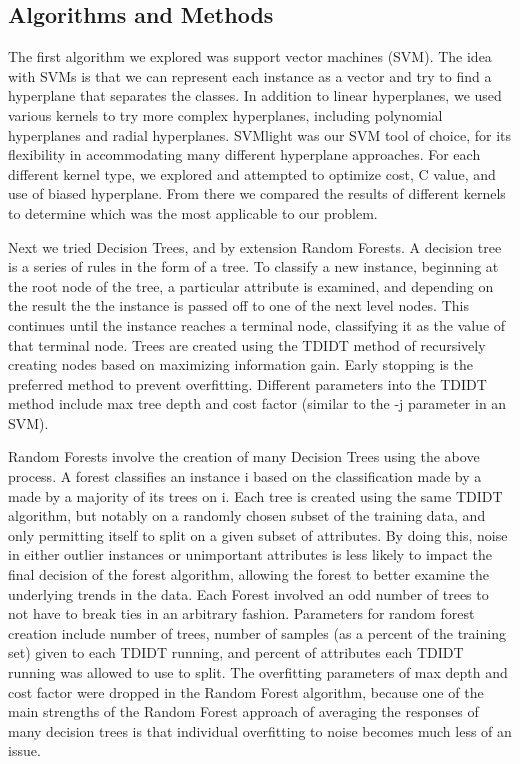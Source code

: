 \documentclass{article}
\begin{document}
\subsection{Algorithms and Methods}
The first algorithm we explored was support vector machines (SVM). The idea with SVMs is that we can represent each instance as a vector and try to find a hyperplane that separates the classes. In addition to linear hyperplanes, we used various kernels to try more complex hyperplanes, including polynomial hyperplanes and radial hyperplanes. SVMlight was our SVM tool of choice, for its flexibility in accommodating many different hyperplane approaches.  
For each different kernel type, we explored and attempted to optimize cost, C value, and use of biased hyperplane. From there we compared the results of different kernels to determine which was the most applicable to our problem.

Next we tried Decision Trees, and by extension Random Forests. A decision tree is a series of rules in the form of a tree. To classify a new instance, beginning at the root node of the tree, a particular attribute is examined, and depending on the result the the instance is passed off to one of the next level nodes. This continues until the instance reaches a terminal node, classifying it as the value of that terminal node. Trees are created using the TDIDT method of recursively creating nodes based on maximizing information gain. Early stopping is the preferred method to prevent overfitting. Different parameters into the TDIDT method include max tree depth and cost factor (similar to the -j parameter in an SVM). 

Random Forests involve the creation of many Decision Trees using the above process. A forest classifies an instance i based on the classification made by a made by a majority of its trees on i. Each tree is created using the same TDIDT algorithm, but notably on a randomly chosen subset of the training data, and only permitting itself to split on a given subset of attributes. By doing this, noise in either outlier instances or unimportant attributes is less likely to impact the final decision of the forest algorithm, allowing the forest to better examine the underlying trends in the data. Each Forest involved an odd number of trees to not have to break ties in an arbitrary fashion. Parameters for random forest creation include number of trees, number of samples (as a percent of the training set) given to each TDIDT running, and percent of attributes each TDIDT running was allowed to use to split. The overfitting parameters of max depth and cost factor were dropped in the Random Forest algorithm, because one of the main strengths of the Random Forest approach of averaging the responses of many decision trees is that individual overfitting to noise becomes much less of an issue.
\end{document}

